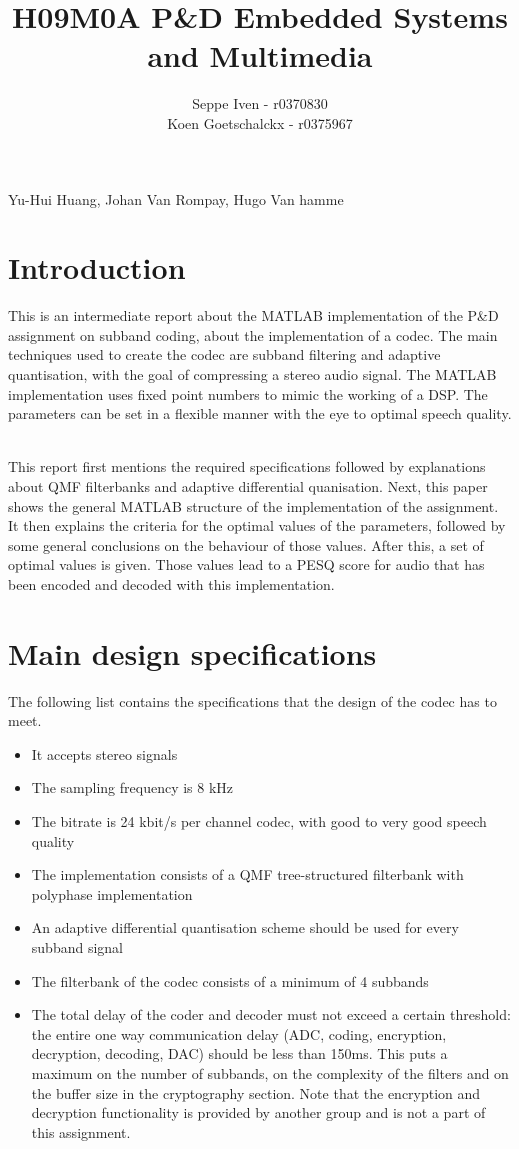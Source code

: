 \documentclass[a4paper]{article}
\title{H09M0A P\&D Embedded Systems and Multimedia}
\author{Seppe Iven - r0370830 \\ Koen Goetschalckx - r0375967}
\begin{document}
 
\maketitle
\begin{center} Yu-Hui Huang, Johan Van Rompay, Hugo Van hamme
\end{center}

\section{Introduction}
This is an intermediate report about the MATLAB implementation of the P\&D assignment on subband coding, about the implementation of a codec. The main techniques used to create the codec are subband filtering and adaptive quantisation, with the goal of compressing a stereo audio signal. The MATLAB implementation uses fixed point numbers to mimic the working of a DSP. The parameters can be set in a flexible manner with the eye to optimal speech quality. \

This report first mentions the required specifications followed by explanations about QMF filterbanks and adaptive differential quanisation. Next, this paper shows the general MATLAB structure of the implementation of the assignment. It then explains the criteria for the optimal values of the parameters, followed by some general conclusions on the behaviour of those values. After this, a set of optimal values is given. Those values lead to a PESQ score for audio that has been encoded and decoded with this implementation.

\section{Main design specifications}
The following list contains the specifications that the design of the codec has to meet.

\begin{itemize}
\item It accepts stereo signals
\item The sampling frequency is 8 kHz
\item The bitrate is 24 kbit/s per channel codec, with good to very good speech quality
\item The implementation consists of a QMF tree-structured filterbank with polyphase implementation
\item An adaptive differential quantisation scheme should be used for every subband signal
\item The filterbank of the codec consists of a minimum of 4 subbands
\item The total delay of the coder and decoder must not exceed a certain threshold: the entire one way communication delay (ADC, coding, encryption, decryption, decoding, DAC) should be less than 150ms. This puts a maximum on the number of subbands, on the complexity of the filters and on the buffer size in the cryptography section. Note that the encryption and decryption functionality is provided by another group and is not a part of this assignment.

\end{itemize}
\end{document}
